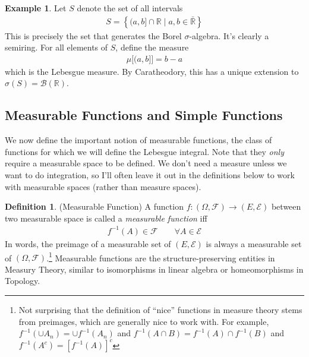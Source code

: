 \documentclass[12pt]{article}
\theoremstyle{plain}
\theoremstyle{definition}
\newtheorem{defn}[thm]{Definition}
\newtheorem{ex}[thm]{Example}
\theoremstyle{remark}
\newcommand{\ra}{\rightarrow}
\newcommand{\sE}{\mathscr{E}}
\newcommand{\sF}{\mathscr{F}}
\newcommand{\sB}{\mathscr{B}}
\newcommand{\calF}{\mathcal{F}}
\newcommand{\R}{\mathbb{R}}
\begin{document}
\begin{ex}
Let $S$ denote the set of all intervals
\begin{align*}
  S = \left\{ (a,b] \cap \R \;|\; a,b\in\bar{\R}\right\}
\end{align*}
This is precisely the set that generates the Borel $\sigma$-algebra.
It's clearly a semiring. For all elements of $S$, define the measure
\begin{align*}
  \mu\big[(a,b]\big] = b-a
\end{align*}
which is the Lebesgue measure. By Caratheodory, this has a unique
extension to $\sigma(S)=\sB(\R)$.
\end{ex}

\subsection{Measurable Functions and Simple Functions}

We now define the important notion of measurable functions, the class of
functions for which we will define the Lebesgue integral. Note that they
\emph{only} require a measurable space to be defined. We don't need a
measure unless we want to do integration, so I'll often leave it out in
the definitions below to work with measurable spaces (rather than
measure spaces).

\begin{defn}(Measurable Function)
A function $f:(\Omega,\sF)\ra (E,\sE)$ between two measurable space
is called a \emph{measurable function} iff
\begin{align*}
  f^{-1}(A) \in \sF \qquad \forall A\in \sE
\end{align*}
In words, the preimage of a measurable set of $(E,\sE)$ is always a
measurable set of $(\Omega,\sF)$.\footnote{%
  Not surprising that the definition of ``nice'' functions in measure
  theory stems from preimages, which are generally nice to work with.
  For example, $f^{-1}\left( \cup A_n \right) = \cup f^{-1}(A_n)$
  and $f^{-1}(A\cap B) = f^{-1}(A)\cap f^{-1}(B)$ and
  $f^{-1}(A^c)= [f^{-1}(A)]^c$
}
Measurable functions are the
structure-preserving entities in Measury Theory, similar to isomorphisms
in linear algebra or homeomorphisms in Topology.
\end{defn}

\end{document}
